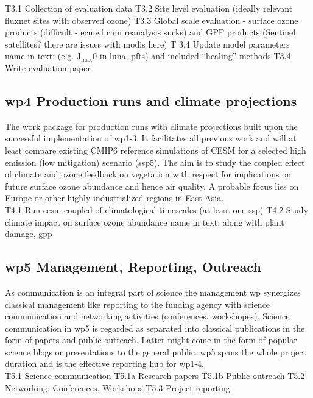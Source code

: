 T3.1 Collection of evaluation data 
T3.2 Site level evaluation (ideally relevant fluxnet sites with observed ozone)
T3.3 Global scale evaluation - surface ozone products (difficult - \gls{ecmwf} \gls{cam} reanalysis sucks) and GPP products (Sentinel satellites? there are issues with \gls{modis} here)
T 3.4 Update model parameters 
name in text: (e.g. $\mathrm{J_{max}}$0 in \gls{luna}, \glspl{pft}) and included “healing” methods
T3.4 Write evaluation paper

\subsection*{\gls{wp}4 Production runs and climate projections}
\label{ssec:wp4}
The work package for production runs with climate projections built upon the successful implementation of \gls{wp}1-3. It facilitates all previous work and will at least compare existing CMIP6 reference simulations of CESM for a selected high emission (low mitigation) scenario (\gls{ssp}5). The aim is to study the coupled effect of climate and ozone feedback on vegetation with respect for implications on future surface ozone abundance and hence air quality. A probable focus lies on Europe or other highly industrialized regions in East Asia.\\
 
T4.1 Run \gls{cesm} coupled of climatological timescales (at least one \gls{ssp})
T4.2 Study climate impact on surface ozone abundance 
name in text: along with plant damage, gpp

\subsection*{\gls{wp}5 Management, Reporting, Outreach}
\label{ssec:wp5}
As communication is an integral part of science the management \gls{wp} synergizes classical management like reporting to the funding agency with science communication and networking activities (conferences, workshopes). Science communication in \gls{wp}5 is regarded as separated into classical publications in the form of papers and public outreach. Latter might come in the form of popular science blogs or presentations to the general public. \gls{wp}5 spans the whole project duration and is the effective reporting hub for \gls{wp}1-4.\\
 
T5.1 Science communication
T5.1a Research papers
T5.1b Public outreach
T5.2 Networking: Conferences, Workshops
T5.3 Project reporting
